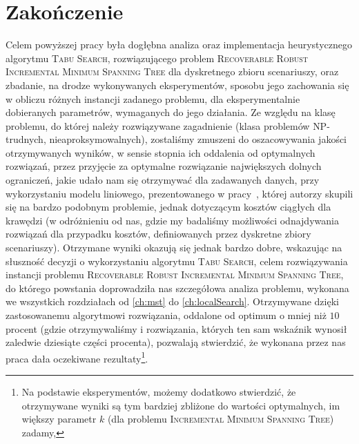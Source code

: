 \chapter{Zakończenie}
\thispagestyle{chapterBeginStyle}

Celem powyższej pracy była dogłębna analiza oraz implementacja heurystycznego algorytmu \textsc{Tabu Search}, rozwiązującego problem \textsc{Recoverable Robust Incremental Minimum Spanning Tree} dla dyskretnego zbioru scenariuszy, oraz zbadanie, na drodze wykonywanych eksperymentów, sposobu jego zachowania się w obliczu różnych instancji zadanego problemu, dla eksperymentalnie dobieranych parametrów, wymaganych do jego działania. Ze względu na klasę problemu, do której należy rozwiązywane zagadnienie (klasa problemów \textsc{NP}-trudnych, nieaproksymowalnych), zostaliśmy zmuszeni do oszacowywania jakości otrzymywanych wyników, w sensie stopnia ich oddalenia od optymalnych rozwiązań, przez przyjęcie za optymalne rozwiązanie największych dolnych ograniczeń, jakie udało nam się otrzymywać dla zadawanych danych, przy wykorzystaniu modelu liniowego, prezentowanego w pracy~\cite{DBLP:journals/corr/HradovichKZ16}, której autorzy skupili się na bardzo podobnym problemie, jednak dotyczącym kosztów ciągłych dla krawędzi (w odróżnieniu od nas, gdzie my badaliśmy możliwości odnajdywania rozwiązań dla przypadku kosztów, definiowanych przez dyskretne zbiory scenariuszy). Otrzymane wyniki okazują się jednak bardzo dobre, wskazując na słuszność decyzji o wykorzystaniu algorytmu \textsc{Tabu Search}, celem rozwiązywania instancji problemu \textsc{Recoverable Robust Incremental Minimum Spanning Tree}, do którego powstania doprowadziła nas szczegółowa analiza problemu, wykonana we wszystkich rozdziałach od \ref{ch:mst} do \ref{ch:localSearch}. Otrzymywane dzięki zastosowanemu algorytmowi rozwiązania, oddalone od optimum o mniej niż $10$ procent (gdzie otrzymywaliśmy i rozwiązania, których ten sam wskaźnik wynosił zaledwie dziesiąte części procenta), pozwalają stwierdzić, że wykonana przez nas praca dała oczekiwane rezultaty\footnote{Na podstawie eksperymentów, możemy dodatkowo stwierdzić, że otrzymywane wyniki są tym bardziej zbliżone do wartości optymalnych, im większy parametr $k$ (dla problemu \textsc{Incremental Minimum Spanning Tree}) zadamy,}.